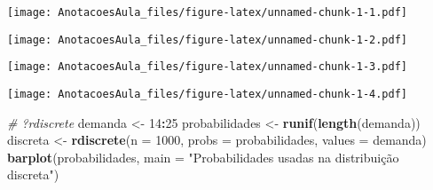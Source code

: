 \documentclass[
]{article}
\newenvironment{Shaded}{\begin{snugshade}}{\end{snugshade}}
\newcommand{\CommentTok}[1]{\textcolor[rgb]{0.56,0.35,0.01}{\textit{#1}}}
\newcommand{\DataTypeTok}[1]{\textcolor[rgb]{0.13,0.29,0.53}{#1}}
\newcommand{\DecValTok}[1]{\textcolor[rgb]{0.00,0.00,0.81}{#1}}
\newcommand{\FloatTok}[1]{\textcolor[rgb]{0.00,0.00,0.81}{#1}}
\newcommand{\KeywordTok}[1]{\textcolor[rgb]{0.13,0.29,0.53}{\textbf{#1}}}
\newcommand{\NormalTok}[1]{#1}
\newcommand{\OperatorTok}[1]{\textcolor[rgb]{0.81,0.36,0.00}{\textbf{#1}}}
\newcommand{\StringTok}[1]{\textcolor[rgb]{0.31,0.60,0.02}{#1}}
\begin{document}
\texttt{[image: AnotacoesAula\_files/figure-latex/unnamed-chunk-1-1.pdf]}

\begin{Shaded}
\end{Shaded}

\texttt{[image: AnotacoesAula\_files/figure-latex/unnamed-chunk-1-2.pdf]}

\begin{Shaded}
\end{Shaded}

\texttt{[image: AnotacoesAula\_files/figure-latex/unnamed-chunk-1-3.pdf]}

\begin{Shaded}
\end{Shaded}

\texttt{[image: AnotacoesAula\_files/figure-latex/unnamed-chunk-1-4.pdf]}

\begin{Shaded}
\begin{Highlighting}[]
\CommentTok{# ?rdiscrete}
\NormalTok{demanda <-}\StringTok{ }\DecValTok{14}\OperatorTok{:}\DecValTok{25}
\NormalTok{probabilidades <-}\StringTok{ }\KeywordTok{runif}\NormalTok{(}\KeywordTok{length}\NormalTok{(demanda))}
\NormalTok{discreta <-}\StringTok{ }\KeywordTok{rdiscrete}\NormalTok{(}\DataTypeTok{n =} \DecValTok{1000}\NormalTok{, }\DataTypeTok{probs =}\NormalTok{ probabilidades, }\DataTypeTok{values =}\NormalTok{ demanda)}
\KeywordTok{barplot}\NormalTok{(probabilidades, }\DataTypeTok{main =} \StringTok{"Probabilidades usadas na distribuição discreta"}\NormalTok{)}
\end{Highlighting}
\end{Shaded}
\end{document}
